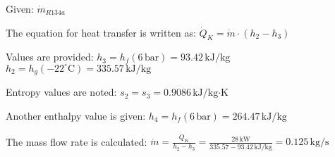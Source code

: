 Given: \( \dot{m}_{R134a} \)  

The equation for heat transfer is written as:  
\( \dot{Q}_K = \dot{m} \cdot (h_2 - h_3) \)  

Values are provided:  
\( h_3 = h_f (6 \, \text{bar}) = 93.42 \, \text{kJ/kg} \)  
\( h_2 = h_g (-22^\circ \text{C}) = 335.57 \, \text{kJ/kg} \)  

Entropy values are noted:  
\( s_2 = s_3 = 0.9086 \, \text{kJ/kg·K} \)  

Another enthalpy value is given:  
\( h_4 = h_f (6 \, \text{bar}) = 264.47 \, \text{kJ/kg} \)  

The mass flow rate is calculated:  
\( \dot{m} = \frac{\dot{Q}_K}{h_2 - h_3} = \frac{28 \, \text{kW}}{335.57 - 93.42 \, \text{kJ/kg}} = 0.125 \, \text{kg/s} \)